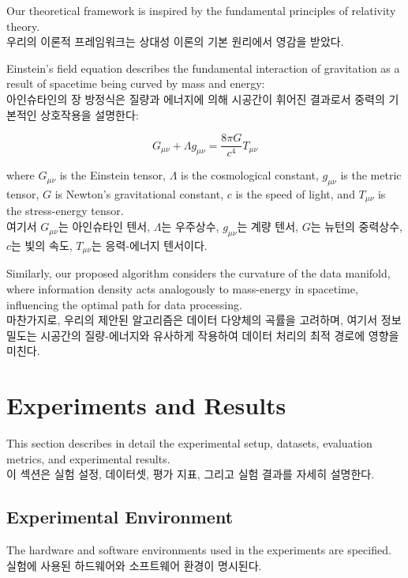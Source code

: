 \documentclass[12pt,a4paper]{article}
\begin{document}
Our theoretical framework is inspired by the fundamental principles of relativity theory. \\
우리의 이론적 프레임워크는 상대성 이론의 기본 원리에서 영감을 받았다.

Einstein's field equation describes the fundamental interaction of gravitation as a result of spacetime being curved by mass and energy: \\
아인슈타인의 장 방정식은 질량과 에너지에 의해 시공간이 휘어진 결과로서 중력의 기본적인 상호작용을 설명한다:

\begin{equation}
G_{\mu\nu} + \Lambda g_{\mu\nu} = \frac{8\pi G}{c^4} T_{\mu\nu}
\end{equation}

where $G_{\mu\nu}$ is the Einstein tensor, $\Lambda$ is the cosmological constant, $g_{\mu\nu}$ is the metric tensor, $G$ is Newton's gravitational constant, $c$ is the speed of light, and $T_{\mu\nu}$ is the stress-energy tensor. \\
여기서 $G_{\mu\nu}$는 아인슈타인 텐서, $\Lambda$는 우주상수, $g_{\mu\nu}$는 계량 텐서, $G$는 뉴턴의 중력상수, $c$는 빛의 속도, $T_{\mu\nu}$는 응력-에너지 텐서이다.

Similarly, our proposed algorithm considers the curvature of the data manifold, where information density acts analogously to mass-energy in spacetime, influencing the optimal path for data processing. \\
마찬가지로, 우리의 제안된 알고리즘은 데이터 다양체의 곡률을 고려하며, 여기서 정보 밀도는 시공간의 질량-에너지와 유사하게 작용하여 데이터 처리의 최적 경로에 영향을 미친다.

\section{Experiments and Results}
\label{sec:experiments}

This section describes in detail the experimental setup, datasets, evaluation metrics, and experimental results. \\
이 섹션은 실험 설정, 데이터셋, 평가 지표, 그리고 실험 결과를 자세히 설명한다.

\subsection{Experimental Environment}
The hardware and software environments used in the experiments are specified. \\
실험에 사용된 하드웨어와 소프트웨어 환경이 명시된다.
\end{document}
